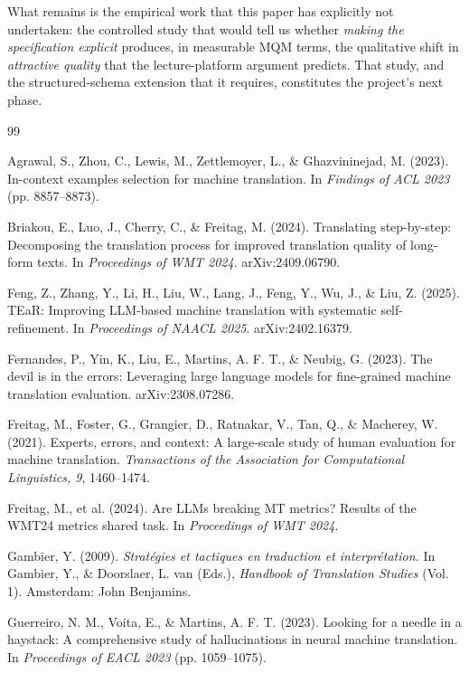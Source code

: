 \documentclass[11pt]{article}
\begin{document}
What remains is the empirical work that this paper has explicitly not undertaken: the controlled study that would tell us whether \emph{making the specification explicit} produces, in measurable MQM terms, the qualitative shift in \emph{attractive quality} that the lecture-platform argument predicts. That study, and the structured-schema extension that it requires, constitutes the project's next phase.

\begin{thebibliography}{99}

 Agrawal, S., Zhou, C., Lewis, M., Zettlemoyer, L., \& Ghazvininejad, M. (2023). In-context examples selection for machine translation. In \emph{Findings of ACL 2023} (pp. 8857--8873).

 Briakou, E., Luo, J., Cherry, C., \& Freitag, M. (2024). Translating step-by-step: Decomposing the translation process for improved translation quality of long-form texts. In \emph{Proceedings of WMT 2024}. arXiv:2409.06790.

 Feng, Z., Zhang, Y., Li, H., Liu, W., Lang, J., Feng, Y., Wu, J., \& Liu, Z. (2025). TEaR: Improving LLM-based machine translation with systematic self-refinement. In \emph{Proceedings of NAACL 2025}. arXiv:2402.16379.

 Fernandes, P., Yin, K., Liu, E., Martins, A. F. T., \& Neubig, G. (2023). The devil is in the errors: Leveraging large language models for fine-grained machine translation evaluation. arXiv:2308.07286.

 Freitag, M., Foster, G., Grangier, D., Ratnakar, V., Tan, Q., \& Macherey, W. (2021). Experts, errors, and context: A large-scale study of human evaluation for machine translation. \emph{Transactions of the Association for Computational Linguistics, 9}, 1460--1474.

 Freitag, M., et al. (2024). Are LLMs breaking MT metrics? Results of the WMT24 metrics shared task. In \emph{Proceedings of WMT 2024}.

 Gambier, Y. (2009). \emph{Stratégies et tactiques en traduction et interprétation.} In Gambier, Y., \& Doorslaer, L. van (Eds.), \emph{Handbook of Translation Studies} (Vol. 1). Amsterdam: John Benjamins.

 Guerreiro, N. M., Voita, E., \& Martins, A. F. T. (2023). Looking for a needle in a haystack: A comprehensive study of hallucinations in neural machine translation. In \emph{Proceedings of EACL 2023} (pp. 1059--1075).


\end{thebibliography}
\end{document}
